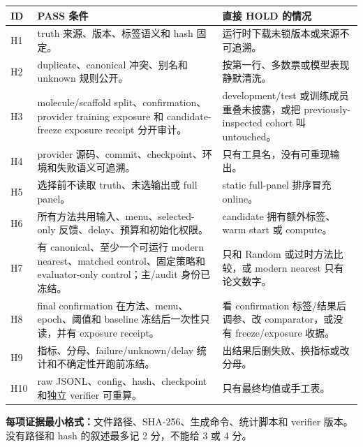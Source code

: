\documentclass[10pt,letterpaper]{article}
\newcommand{\sect}[1]{\vspace{4pt}{\large\bfseries\color{GuideBlue}#1}\par\vspace{2pt}}
\newenvironment{clean}{\begin{center}\fontsize{8.55}{10.05}\selectfont\setlength{\tabcolsep}{3.7pt}\renewcommand{\arraystretch}{1.04}}{\end{center}}
\begin{document}
\newpage
\sect{4. H1--H10 硬条件清单}
\begin{clean}
\begin{tabular}{@{}p{.07\linewidth}p{.39\linewidth}p{.41\linewidth}@{}}
\toprule
ID & PASS 条件 & 直接 HOLD 的情况\\
\midrule
H1 & truth 来源、版本、标签语义和 hash 固定。 & 运行时下载未锁版本或来源不可追溯。\\
H2 & duplicate、canonical 冲突、别名和 unknown 规则公开。 & 按第一行、多数票或模型表现静默清洗。\\
H3 & molecule/scaffold split、confirmation、provider training exposure 和 candidate-freeze exposure receipt 分开审计。 & development/test 或训练成员重叠未披露，或把 previously-inspected cohort 叫 untouched。\\
H4 & provider 源码、commit、checkpoint、环境和失败语义可追溯。 & 只有工具名，没有可重现输出。\\
H5 & 选择前不读取 truth、未选输出或 full panel。 & static full-panel 排序冒充 online。\\
H6 & 所有方法共用输入、menu、selected-only 反馈、delay、预算和初始化权限。 & candidate 拥有额外标签、warm start 或 compute。\\
H7 & 有 canonical、至少一个可运行 modern nearest、matched control、固定策略和 evaluator-only control；主/audit 身份已冻结。 & 只和 Random 或过时方法比较，或 modern nearest 只有论文数字。\\
H8 & final confirmation 在方法、menu、epoch、阈值和 baseline 冻结后一次性只读，并有 exposure receipt。 & 看 confirmation 标签/结果后调参、改 comparator，或没有 freeze/exposure 收据。\\
H9 & 指标、分母、failure/unknown/delay 统计和不确定性开跑前冻结。 & 出结果后删失败、换指标或改分母。\\
H10 & raw JSONL、config、hash、checkpoint 和独立 verifier 可重算。 & 只有最终均值或手工表。\\
\bottomrule
\end{tabular}
\end{clean}
\textbf{每项证据最小格式：}文件路径、SHA-256、生成命令、统计脚本和 verifier 版本。没有路径和 hash 的叙述最多记 2 分，不能给 3 或 4 分。
\end{document}
